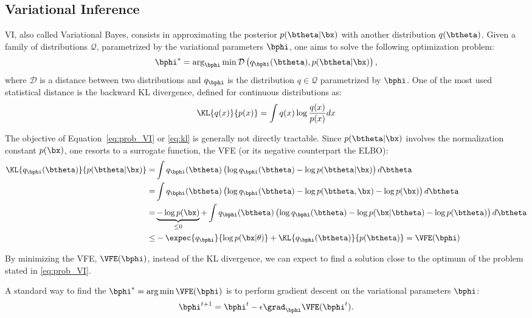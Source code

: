 

\subsection{Variational Inference}

\acf{VI}, also called Variational Bayes, consists in approximating the posterior $p(\btheta|\bx)$ with another distribution $q(\btheta)$.
Given a family of distributions $\mathcal{Q}$, parametrized by the variational parameters $\bphi$, one aims to solve the following optimization problem:
\begin{align}
\bphi^* = \arg_{\bphi}\min \mathcal{D}\left(q_{\bphi}(\btheta), p(\btheta|\bx)\right),
\label{eq:prob_VI}
\end{align}
where $\mathcal{D}$ is a distance between two distributions and $q_{\bphi}$ is the distribution $q\in \mathcal{Q}$ parametrized by $\bphi$.
One of the most used statistical distance is the backward \ac{KL} divergence, defined for continuous distributions as:
\begin{align}
\KL{q(x)}{p(x)} = \int q(x) \log \frac{q(x)}{p(x)}dx
\label{eq:kl}
\end{align}

The objective of Equation~\eqref{eq:prob_VI} or \eqref{eq:kl} is generally not directly tractable.
Since $p(\btheta|\bx)$ involves the normalization constant $p(\bx)$, one resorts to a surrogate function, the \ac{VFE} (or its negative counterpart the \ac{ELBO}):
\begin{align}
\KL{q_{\bphi}(\btheta)}{p(\btheta|\bx)} =& \int q_{\bphi}(\btheta) \left(\log q_{\bphi}(\btheta) - \log p(\btheta|\bx)\right)d\btheta\\
=&\int q_{\bphi}(\btheta) \left(\log q_{\bphi}(\btheta) - \log p(\btheta, \bx) - \log p(\bx)\right)d\btheta\\
=&\underbrace{- \log p(\bx)}_{\leq 0} + \int q_{\bphi}(\btheta) \left(\log q_{\bphi}(\btheta) - \log p(\bx|\btheta)- \log p(\btheta) \right)d\btheta\\
\leq& -\expec{q_{\bphi}}{\log p(\bx|\theta)} + \KL{q_{\bphi}(\btheta)}{p(\btheta)} = \VFE(\bphi)
\end{align}


By minimizing the \ac{VFE}, $\VFE(\bphi)$, instead of the \ac{KL} divergence, we can expect to find a solution close to the optimum of the problem stated in \eqref{eq:prob_VI}.

A standard way to find the $\bphi^* = \arg\min \VFE(\bphi)$ is to perform gradient descent on the variational parameters $\bphi$:
\begin{align}
\bphi^{t+1} = \bphi^{t} - \epsilon \grad_{\bphi}\VFE(\bphi^{t}).
\label{eq:vigraddescent}
\end{align}

